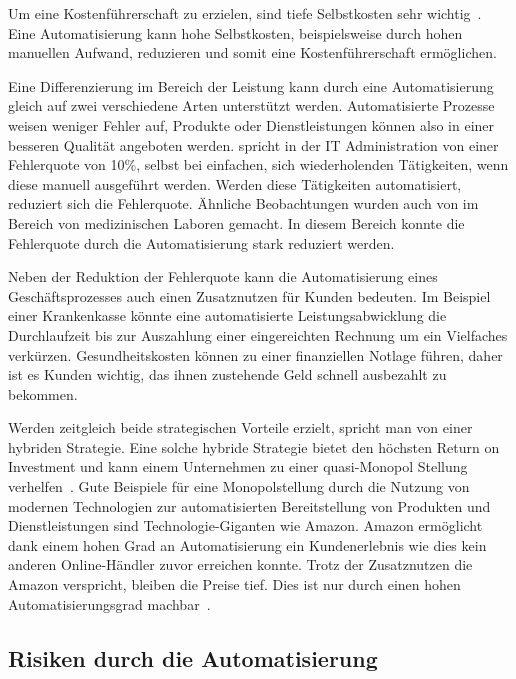 Um eine Kostenführerschaft zu erzielen, sind tiefe Selbstkosten sehr wichtig~\autocite{Capaul2010}. Eine Automatisierung kann hohe Selbstkosten, beispielsweise durch hohen manuellen Aufwand, reduzieren und somit eine Kostenführerschaft ermöglichen.

Eine Differenzierung im Bereich der Leistung kann durch eine Automatisierung gleich auf zwei verschiedene Arten unterstützt werden. Automatisierte Prozesse weisen weniger Fehler auf, Produkte oder Dienstleistungen können also in einer besseren Qualität angeboten werden. \textcite{Kregassner2012} spricht in der IT Administration von einer Fehlerquote von 10\%, selbst bei einfachen, sich wiederholenden Tätigkeiten, wenn diese manuell ausgeführt werden. Werden diese Tätigkeiten automatisiert, reduziert sich die Fehlerquote. Ähnliche Beobachtungen wurden auch von \textcite{Uettwiller-Geiger2005} im Bereich von medizinischen Laboren gemacht. In diesem Bereich konnte die Fehlerquote durch die Automatisierung stark reduziert werden. 

Neben der Reduktion der Fehlerquote kann die Automatisierung eines Geschäftsprozesses auch einen Zusatznutzen für Kunden bedeuten. Im Beispiel einer Krankenkasse könnte eine automatisierte Leistungsabwicklung die Durchlaufzeit bis zur Auszahlung einer eingereichten Rechnung um ein Vielfaches verkürzen. Gesundheitskosten können zu einer finanziellen Notlage führen, daher ist es Kunden wichtig, das ihnen zustehende Geld schnell ausbezahlt zu bekommen.

Werden zeitgleich beide strategischen Vorteile erzielt, spricht man von einer hybriden Strategie. Eine solche hybride Strategie bietet den höchsten Return on Investment und kann einem Unternehmen zu einer quasi-Monopol Stellung verhelfen~\autocite{Lombriser2010}. Gute Beispiele für eine Monopolstellung durch die Nutzung von modernen Technologien zur automatisierten Bereitstellung von Produkten und Dienstleistungen sind Technologie-Giganten wie Amazon. Amazon ermöglicht dank einem hohen Grad an Automatisierung ein Kundenerlebnis wie dies kein anderen Online-Händler zuvor erreichen konnte. Trotz der Zusatznutzen die Amazon verspricht, bleiben die Preise tief. Dies ist nur durch einen hohen Automatisierungsgrad machbar~\autocite{Kha2000}.

\subsection{Risiken durch die Automatisierung}

